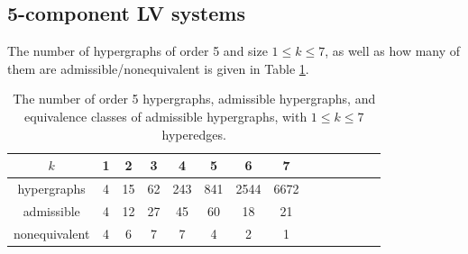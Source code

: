 \documentclass{article}
\begin{document}
\subsection{5-component LV systems}
The number of hypergraphs of order 5 and size $1\leq k\leq7$, as well as how many of them are admissible/nonequivalent is given in Table \ref{t2}.
\begin{table}[h]
\begin{center}
\begin{tabular}{c|cccccccccccc|c}
$k$ & 1 & 2 & 3 & 4 & 5 & 6 & 7 \\
\hline
hypergraphs & 4& 15& 62& 243& 841& 2544& 6672 \\
admissible & 4& 12& 27& 45& 60& 18& 21 \\
nonequivalent & 4& 6& 7& 7& 4& 2& 1 \\
\end{tabular}
\vspace{3mm}

\parbox{11.5cm}{\caption{\label{t2} The number of order 5 hypergraphs, admissible hypergraphs, and equivalence classes of admissible hypergraphs, with $1\leq k\leq 7$ hyperedges.}}
\end{center}
\end{table}
\vspace{-8pt} 
\end{document}
